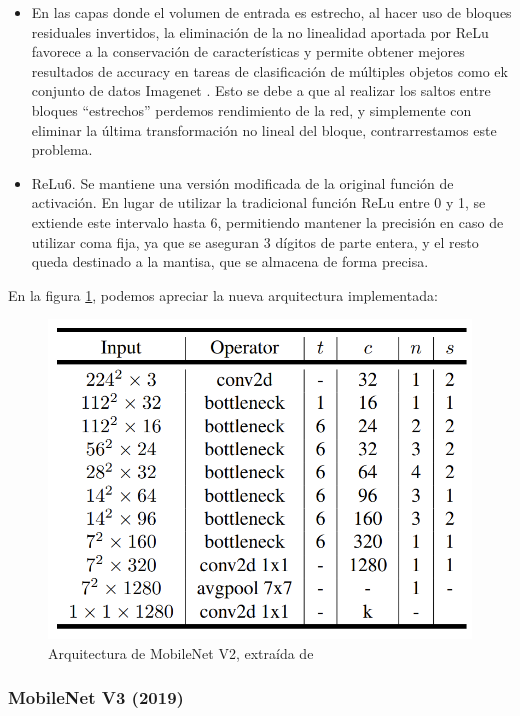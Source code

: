 \begin{itemize}
     \item En las capas donde el volumen de entrada es estrecho, al hacer uso de bloques residuales invertidos, la eliminación de la no linealidad aportada por ReLu favorece a la conservación de características y permite obtener mejores resultados de accuracy en tareas de clasificación de múltiples objetos como ek conjunto de datos Imagenet \cite{NIPS2012_c399862d}. Esto se debe a que al realizar los saltos entre bloques ``estrechos'' perdemos rendimiento de la red, y simplemente con eliminar la última transformación no lineal del bloque, contrarrestamos este problema.
    \item ReLu6. Se mantiene una versión modificada de la original función de activación. En lugar de utilizar la tradicional función ReLu entre 0 y 1, se extiende este intervalo hasta 6, permitiendo mantener la precisión en caso de utilizar coma fija, ya que se aseguran 3 dígitos de parte entera, y el resto queda destinado a la mantisa, que se almacena de forma precisa.
\end{itemize}

En la figura \ref{fig:mobilenet2}, podemos apreciar la nueva arquitectura implementada:

    \begin{figure}[H]
	\centering
	\includegraphics[scale = 0.3]{imagenes/MobileNetV2.png}
	\caption{Arquitectura de MobileNet V2, extraída de \cite{sandler2019mobilenetv2}}
	\label{fig:mobilenet2}
\end{figure}

\subsubsection{MobileNet V3 (2019)}

